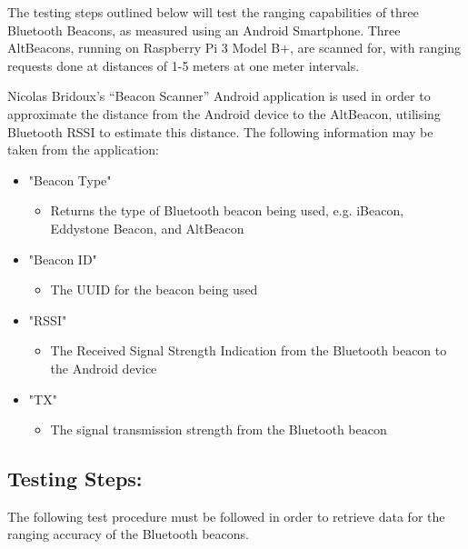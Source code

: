 \documentclass[11pt,a4paper,headinclude=false,footinclude=false]{scrreprt}
\begin{document}
The testing steps outlined below will test the ranging capabilities of
three Bluetooth Beacons, as measured using an Android Smartphone. Three
AltBeacons, running on Raspberry Pi 3 Model B+, are scanned for, with
ranging requests done at distances of 1-5 meters at one meter intervals.

Nicolas Bridoux's ``Beacon Scanner'' Android
application\cite{beaconscan} is used in order to approximate the
distance from the Android device to the AltBeacon, utilising Bluetooth
RSSI to estimate this distance. The following information may be taken
from the application:

\begin{itemize}
 \item "Beacon Type"
 \begin{itemize}
  \item Returns the type of Bluetooth beacon being used, e.g. iBeacon,
  Eddystone Beacon, and AltBeacon
 \end{itemize}
 \item "Beacon ID"
 \begin{itemize}
  \item The UUID for the beacon being used
 \end{itemize}
 \item "RSSI"
 \begin{itemize}
  \item The Received Signal Strength Indication from the Bluetooth beacon to
  the Android device
 \end{itemize}
 \item "TX"
 \begin{itemize}
  \item The signal transmission strength from the Bluetooth beacon
 \end{itemize}
\end{itemize}

\subsection{Testing Steps:}\label{testing-steps-1}

The following test procedure must be followed in order to retrieve data
for the ranging accuracy of the Bluetooth beacons.
\end{document}
